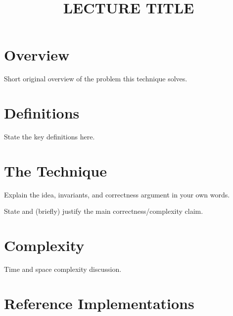 \documentclass[11pt]{article}
\title{LECTURE TITLE}
\author{}
\date{}
\begin{document}
\thispagestyle{fancy}


\section{Overview}
Short original overview of the problem this technique solves.

\section{Definitions}
\begin{definitionbox}
State the key definitions here.
\end{definitionbox}

\section{The Technique}
Explain the idea, invariants, and correctness argument in your own words.

\begin{theorembox}
State and (briefly) justify the main correctness/complexity claim.
\end{theorembox}

\section{Complexity}
Time and space complexity discussion.

%

\section{Reference Implementations}
\end{document}
